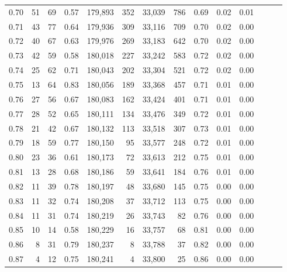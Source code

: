 \begin{tabular}{rrrrrrrrrrrrrr}
0.70 &      51 &     69 &  0.57 &  179,893 &      352 &  33,039 &     786 &  0.69 &  0.02 &      0.01 \\
0.71 &      43 &     77 &  0.64 &  179,936 &      309 &  33,116 &     709 &  0.70 &  0.02 &      0.00 \\
0.72 &      40 &     67 &  0.63 &  179,976 &      269 &  33,183 &     642 &  0.70 &  0.02 &      0.00 \\
0.73 &      42 &     59 &  0.58 &  180,018 &      227 &  33,242 &     583 &  0.72 &  0.02 &      0.00 \\
0.74 &      25 &     62 &  0.71 &  180,043 &      202 &  33,304 &     521 &  0.72 &  0.02 &      0.00 \\
0.75 &      13 &     64 &  0.83 &  180,056 &      189 &  33,368 &     457 &  0.71 &  0.01 &      0.00 \\
0.76 &      27 &     56 &  0.67 &  180,083 &      162 &  33,424 &     401 &  0.71 &  0.01 &      0.00 \\
0.77 &      28 &     52 &  0.65 &  180,111 &      134 &  33,476 &     349 &  0.72 &  0.01 &      0.00 \\
0.78 &      21 &     42 &  0.67 &  180,132 &      113 &  33,518 &     307 &  0.73 &  0.01 &      0.00 \\
0.79 &      18 &     59 &  0.77 &  180,150 &       95 &  33,577 &     248 &  0.72 &  0.01 &      0.00 \\
0.80 &      23 &     36 &  0.61 &  180,173 &       72 &  33,613 &     212 &  0.75 &  0.01 &      0.00 \\
0.81 &      13 &     28 &  0.68 &  180,186 &       59 &  33,641 &     184 &  0.76 &  0.01 &      0.00 \\
0.82 &      11 &     39 &  0.78 &  180,197 &       48 &  33,680 &     145 &  0.75 &  0.00 &      0.00 \\
0.83 &      11 &     32 &  0.74 &  180,208 &       37 &  33,712 &     113 &  0.75 &  0.00 &      0.00 \\
0.84 &      11 &     31 &  0.74 &  180,219 &       26 &  33,743 &      82 &  0.76 &  0.00 &      0.00 \\
0.85 &      10 &     14 &  0.58 &  180,229 &       16 &  33,757 &      68 &  0.81 &  0.00 &      0.00 \\
0.86 &       8 &     31 &  0.79 &  180,237 &        8 &  33,788 &      37 &  0.82 &  0.00 &      0.00 \\
0.87 &       4 &     12 &  0.75 &  180,241 &        4 &  33,800 &      25 &  0.86 &  0.00 &      0.00 \\

\end{tabular}
